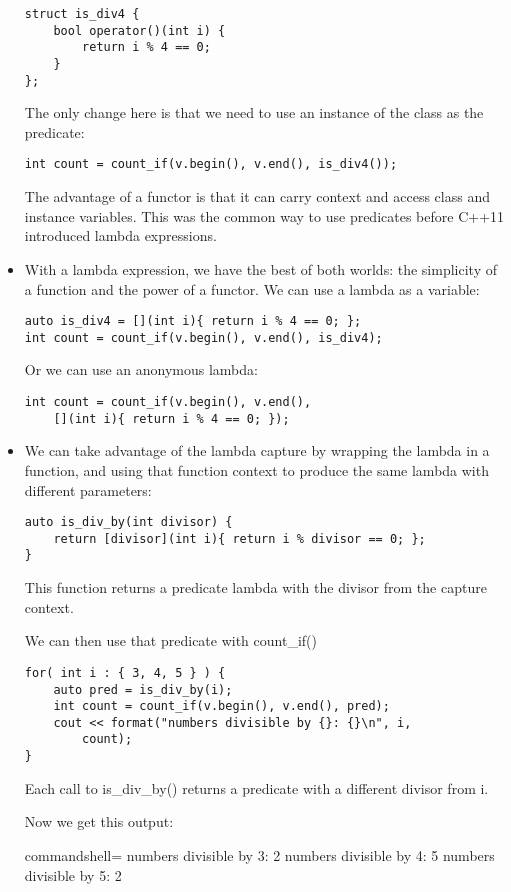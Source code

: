 \begin{itemize}
\begin{lstlisting}[style=styleCXX]
struct is_div4 {
	bool operator()(int i) {
		return i % 4 == 0;
	}
};
\end{lstlisting}

The only change here is that we need to use an instance of the class as the predicate:

\begin{lstlisting}[style=styleCXX]
int count = count_if(v.begin(), v.end(), is_div4());
\end{lstlisting}

The advantage of a functor is that it can carry context and access class and instance variables. This was the common way to use predicates before C++11 introduced lambda expressions.

\item 
With a lambda expression, we have the best of both worlds: the simplicity of a function and the power of a functor. We can use a lambda as a variable:

\begin{lstlisting}[style=styleCXX]
auto is_div4 = [](int i){ return i % 4 == 0; };
int count = count_if(v.begin(), v.end(), is_div4);
\end{lstlisting}

Or we can use an anonymous lambda:

\begin{lstlisting}[style=styleCXX]
int count = count_if(v.begin(), v.end(),
	[](int i){ return i % 4 == 0; });
\end{lstlisting}

\item 
We can take advantage of the lambda capture by wrapping the lambda in a function, and using that function context to produce the same lambda with different parameters:

\begin{lstlisting}[style=styleCXX]
auto is_div_by(int divisor) {
	return [divisor](int i){ return i % divisor == 0; };
}
\end{lstlisting}

This function returns a predicate lambda with the divisor from the capture context.

We can then use that predicate with count\_if()

\begin{lstlisting}[style=styleCXX]
for( int i : { 3, 4, 5 } ) {
	auto pred = is_div_by(i);
	int count = count_if(v.begin(), v.end(), pred);
	cout << format("numbers divisible by {}: {}\n", i,
		count);
}
\end{lstlisting}

Each call to is\_div\_by() returns a predicate with a different divisor from i.

Now we get this output:

\begin{tcblisting}{commandshell={}}
numbers divisible by 3: 2
numbers divisible by 4: 5
numbers divisible by 5: 2
\end{tcblisting}
\end{itemize}

